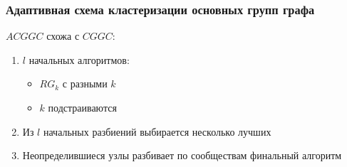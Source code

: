




\begin{frame}
	\frametitle{Адаптивная схема кластеризации основных групп графа}

	$ACGGC$ схожа с $CGGC$:
	\begin{enumerate}
		\item $l$ начальных алгоритмов:
		\begin{itemize}
			\item $RG_k$ с разными $k$
			\item $k$ подстраиваются
		\end{itemize}
		\item Из $l$ начальных разбиений выбирается несколько лучших
		\item Неопределившиеся узлы разбивает по сообществам финальный алгоритм
	\end{enumerate}
\end{frame}


